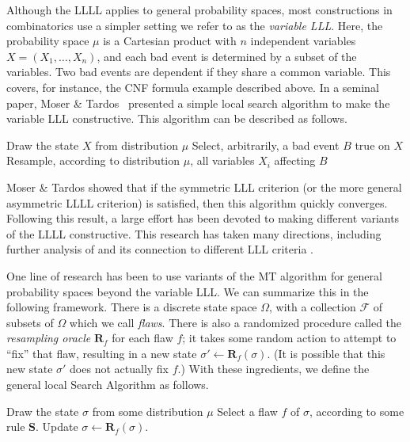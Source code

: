 \documentclass{toc}
\begin{document}
Although the LLLL applies to general probability spaces, most constructions in combinatorics use a simpler setting we refer to as the \emph{variable LLL}. Here, the probability space $\mu$ is a Cartesian product with $n$ independent variables $X = (X_1, \dots, X_n)$, and each bad event is determined by a subset of the variables. Two bad events are dependent if they share a common variable. This covers, for instance, the CNF formula example described above. In a seminal
%
paper,  %
Moser \& Tardos~\cite{MT} presented a simple local search algorithm to make the
%
variable LLL   %
constructive. This algorithm can be described 
as follows. %
\begin{algorithm}[H]
\centering
\label{gen-alg}
\begin{algorithmic}[1]
  \State Draw the state $X$ from distribution $\mu$
\State Select, arbitrarily, a bad event $B$ true on $X$
\State Resample, according to distribution $\mu$, all variables $X_i$ affecting $B$
\EndWhile
\end{algorithmic}
\caption{The Moser-Tardos (MT) resampling algorithm}
\label{mt-alg}
\end{algorithm}


Moser \& Tardos showed that if the symmetric LLL criterion (or %
the  %
more general asymmetric LLLL criterion) is satisfied, then this algorithm quickly
converges. Following this %
result,  %
a large effort has been devoted to making different variants  of the LLLL constructive. This research has taken many directions, including further analysis of  and its connection to different LLL criteria \cite{determ,szege_meet,PegdenIndepen}.

One line of research has been to use variants of the MT algorithm for general probability spaces beyond the variable LLL. We can summarize this in the following framework.
%
%
There is a discrete state space $\Omega$, with a collection $\mathcal{F}$ of subsets  of $\Omega$ which we call
%
\emph{flaws}.  %
There is also a randomized procedure called the \emph{resampling oracle} $\mathbf R_f$ for each flaw $f$; it takes some random action to attempt to ``fix'' that flaw, resulting in a new state $\sigma' \leftarrow \mathbf R_f(\sigma)$. (It is possible that this new state $\sigma'$ does not actually fix $f$.) With these ingredients, we define the general local Search Algorithm as follows. %
%

\begin{algorithm}[H]
\centering
\begin{algorithmic}[1]
  \State Draw the state $\sigma$ from some distribution $\mu$
\State Select a flaw $f$ of $\sigma$, according to some rule $\mathbf S$.
\State Update $\sigma \leftarrow  \mathbf R_f(\sigma)$.
\EndWhile
\end{algorithmic}
\caption{The Search Algorithm}
\label{ls-alg}
\end{algorithm}
\end{document}

